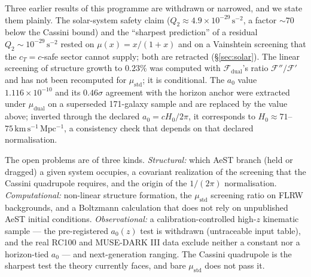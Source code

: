\documentclass[aps,prd,preprint,superscriptaddress,nofootinbib,amsmath,amssymb,floatfix]{revtex4-2}
\makeatletter
\DeclareRobustCommand{\_}{%
    \ifmmode\nfss@text{\textunderscore}\else\textunderscore\penalty\z@\fi}%
\makeatother
\begin{document}
Three earlier results of this programme are withdrawn or narrowed, and we state them plainly. The solar-system safety claim ($Q_2 \approx 4.9\times10^{-29}\,\mathrm{s^{-2}}$, a factor $\sim70$ below the Cassini bound) and the ``sharpest prediction'' of a residual $Q_2 \sim 10^{-29}\,\mathrm{s^{-2}}$ rested on $\mu(x) = x/(1+x)$ and on a Vainshtein screening that the $c_T = c$-safe sector cannot supply; both are retracted  (\S\ref{sec:solar}). The linear screening of structure growth to $0.23\%$ was computed with $\mathcal{F}_{\text{dual}}$'s ratio $\mathcal{F}''/\mathcal{F}'$ and has not been recomputed for $\mu_{\text{std}}$; it is conditional. The $a_0$ value $1.116\times10^{-10}$ and its $0.46\sigma$ agreement with the horizon anchor were extracted under $\mu_{\text{dual}}$ on a superseded 171-galaxy sample and are replaced by the value above; inverted through the declared $a_0 = cH_0/2\pi$, it corresponds to $H_0 \approx 71$--$75\,\mathrm{km\,s^{-1}\,Mpc^{-1}}$, a consistency check that depends on that declared normalisation.

The open problems are of three kinds. \emph{Structural:} which AeST branch (held or dragged) a given system occupies, a covariant realization of the screening that the Cassini quadrupole requires, and the origin of the $1/(2\pi)$ normalisation. \emph{Computational:} non-linear structure formation, the $\mu_{\text{std}}$ screening ratio on FLRW backgrounds, and a Boltzmann calculation that does not rely on unpublished AeST initial conditions. \emph{Observational:} a calibration-controlled high-$z$ kinematic sample --- the pre-registered $a_0(z)$ test is withdrawn (untraceable input table), and the real RC100 and MUSE-DARK III data exclude neither a constant nor a horizon-tied $a_0$ --- and next-generation ranging. The Cassini quadrupole is the sharpest test the theory currently faces, and bare $\mu_{\text{std}}$ does not pass it.
\end{document}
